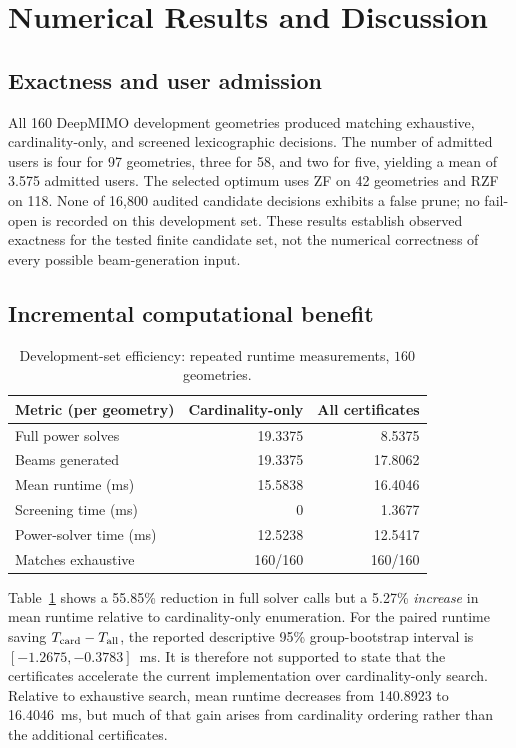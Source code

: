 
\section{Numerical Results and Discussion}
\subsection{Exactness and user admission}
All 160 DeepMIMO development geometries produced matching exhaustive, cardinality-only, and screened lexicographic decisions. The number of admitted users is four for 97 geometries, three for 58, and two for five, yielding a mean of 3.575 admitted users. The selected optimum uses ZF on 42 geometries and RZF on 118. None of 16,800 audited candidate decisions exhibits a false prune; no fail-open is recorded on this development set. These results establish observed exactness for the tested finite candidate set, not the numerical correctness of every possible beam-generation input.

\subsection{Incremental computational benefit}
\begin{table}[t]
\caption{Development-set efficiency: repeated runtime measurements, $160$ geometries.}
\label{tab:main}
\centering\footnotesize
\begin{tabular}{lrr}
\toprule
Metric (per geometry) & Cardinality-only & All certificates\\
\midrule
Full power solves & 19.3375 & 8.5375\\
Beams generated & 19.3375 & 17.8062\\
Mean runtime (ms) & 15.5838 & 16.4046\\
Screening time (ms) & 0 & 1.3677\\
Power-solver time (ms) & 12.5238 & 12.5417\\
Matches exhaustive & 160/160 & 160/160\\
\bottomrule
\end{tabular}
\end{table}

Table~\ref{tab:main} shows a 55.85\% reduction in full solver calls but a 5.27\% \emph{increase} in mean runtime relative to cardinality-only enumeration. For the paired runtime saving $T_{\rm card}-T_{\rm all}$, the reported descriptive 95\% group-bootstrap interval is $[-1.2675,-0.3783]$~ms. It is therefore not supported to state that the certificates accelerate the current implementation over cardinality-only search. Relative to exhaustive search, mean runtime decreases from 140.8923 to 16.4046~ms, but much of that gain arises from cardinality ordering rather than the additional certificates.

